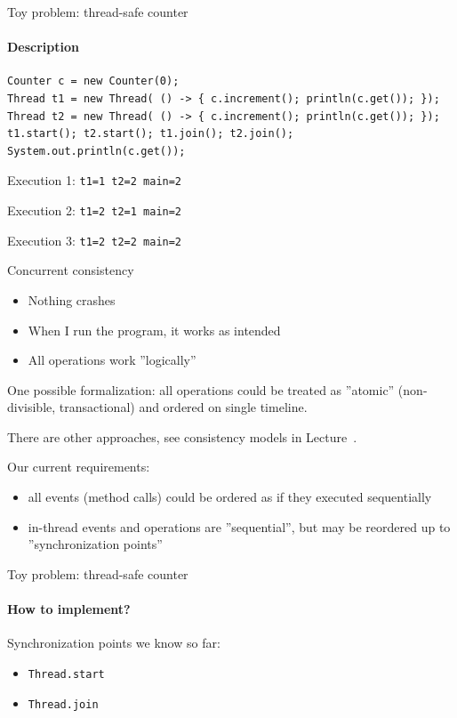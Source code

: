 \begin{frame}[t,fragile]{Toy problem: thread-safe counter}
\framesubtitle{Description}

\begin{verbatim}
Counter c = new Counter(0);
Thread t1 = new Thread( () -> { c.increment(); println(c.get()); });
Thread t2 = new Thread( () -> { c.increment(); println(c.get()); });
t1.start(); t2.start(); t1.join(); t2.join();
System.out.println(c.get());
\end{verbatim}    

\pause
Execution 1: \texttt{t1=1 t2=2 main=2}

\pause
Execution 2: \texttt{t1=2 t2=1 main=2}

\pause
Execution 3: \texttt{t1=2 t2=2 main=2}

\end{frame}

\begin{frame}[fragile]{Concurrent consistency}

\begin{itemize}
    \item Nothing crashes
    \pause
    \item When I run the program, it works as intended
    \pause
    \item All operations work ''logically''
\end{itemize}
\pause
One possible formalization: all operations could be treated as ''atomic'' (non-divisible, transactional) and ordered on single timeline.

\pause
There are other approaches, see consistency models in Lecture~\foundationsNum.

\pause
Our current requirements:
\begin{itemize}
    \item all events (method calls) could be ordered as if they executed sequentially
    \item in-thread events and operations are ''sequential'', but may be reordered up to ''synchronization points''
\end{itemize}
\end{frame}


\begin{frame}[t]{Toy problem: thread-safe counter}
\framesubtitle{How to implement?}

Synchronization points we know so far:
\begin{itemize}
    \item \texttt{Thread.start}
    \item \texttt{Thread.join}
\end{itemize}

\end{frame}


